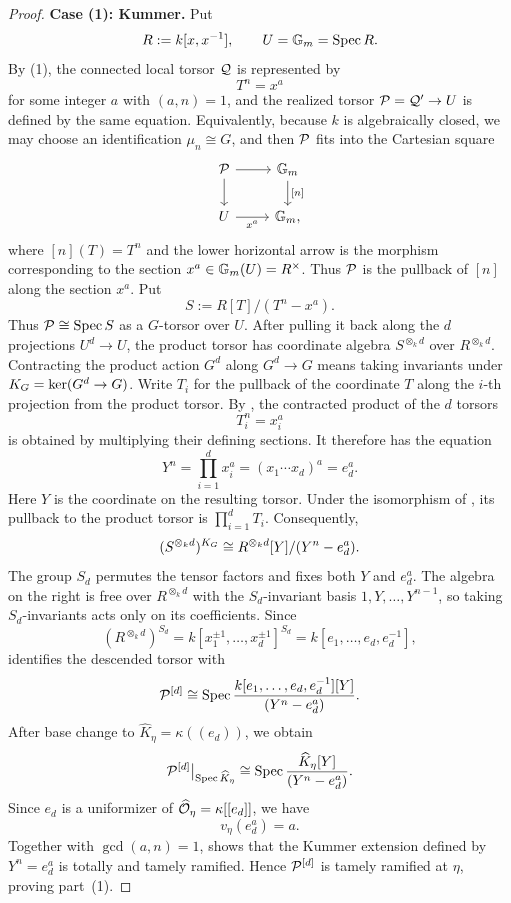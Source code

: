 \begin{proof}
\medskip
\noindent\textbf{Case (1): Kummer.}
Put
\[
    R:=k[x,x^{-1}],\qquad U=\mathbb{G}_m=\operatorname{Spec} R.
\]
By (1), the connected local torsor $\mathcal{Q}$ is
represented by
\[
    T^n=x^a
\]
for some integer $a$ with $(a,n)=1$, and the realized torsor
$\mathcal{P}=\mathcal{Q}'\to U$ is defined by the same equation. Equivalently, because
$k$ is algebraically closed, we may choose an identification $\mu_n\cong G$,
and then $\mathcal{P}$ fits into the Cartesian square
\[
\begin{tikzcd}
    \cP \arrow[r] \arrow[d]
        & \bG_m \arrow[d,"{[n]}"] \\
    U \arrow[r,"{x^a}"']
        & \bG_m,
\end{tikzcd}
\]
where $[n](T)=T^n$ and the lower horizontal arrow is the morphism
corresponding to the section $x^a\in\mathbb{G}_m(U)=R^\times$. Thus $\mathcal{P}$ is the
pullback of $[n]$ along the section $x^a$. Put
\[
    S:=R[T]/(T^n-x^a).
\]
Thus $\mathcal{P}\cong\operatorname{Spec} S$ as a $G$-torsor over $U$. After pulling it
back along the $d$ projections $U^d\to U$, the product torsor has
coordinate algebra $S^{\otimes_k d}$ over $R^{\otimes_k d}$. Contracting the
product action $G^d$ along $G^d\to G$ means taking invariants under
$K_{G}=\ker(G^d\to G)$. Write $T_i$ for the pullback of the coordinate $T$
along the $i$-th projection from the product torsor. By
, the contracted product of the
$d$ torsors
\[
    T_i^n=x_i^a
\]
is obtained by multiplying their defining sections. It therefore has the
equation
\[
    Y^n=\prod_{i=1}^d x_i^a
       =(x_1\cdots x_d)^a
       =e_d^a.
\]
Here $Y$ is the coordinate on the resulting torsor. Under the isomorphism
of , its pullback to the product
torsor is $\prod_{i=1}^d T_i$. Consequently,
\[
    (S^{\otimes_k d})^{K_{G}}
       \cong
    R^{\otimes_k d}[Y]/(Y^n-e_d^a).
\]
The group $S_d$ permutes the tensor factors and fixes both $Y$ and $e_d^a$.
The algebra on the right is free over $R^{\otimes_k d}$ with the
$S_d$-invariant basis $1,Y,\dots,Y^{n-1}$, so taking $S_d$-invariants acts
only on its coefficients. Since
\[
    (R^{\otimes_k d})^{S_d}
       =k[x_1^{\pm1},\dots,x_d^{\pm1}]^{S_d}
       =k[e_1,\dots,e_d,e_d^{-1}],
\]
 identifies the descended torsor with
\[
    \mathcal{P}^{[d]}\cong
    \operatorname{Spec}\frac{k[e_1,\dots,e_d,e_d^{-1}][Y]}{(Y^n-e_d^a)}.
\]
After base change to $\widehat K_\eta=\kappa((e_d))$, we obtain
\[
    \mathcal{P}^{[d]}\big|_{\operatorname{Spec}\widehat K_\eta}
       \cong
    \operatorname{Spec}\frac{\widehat K_\eta[Y]}{(Y^n-e_d^a)}.
\]
Since $e_d$ is a uniformizer of $\widehat{\mathcal{O}}_\eta=\kappa[[e_d]]$, we have
\[
    v_\eta(e_d^a)=a.
\]
Together with $\gcd(a,n)=1$,  shows that
the Kummer extension defined by $Y^n=e_d^a$ is totally and tamely ramified.
Hence $\mathcal{P}^{[d]}$ is tamely ramified at $\eta$, proving part~(1).


\end{proof}
